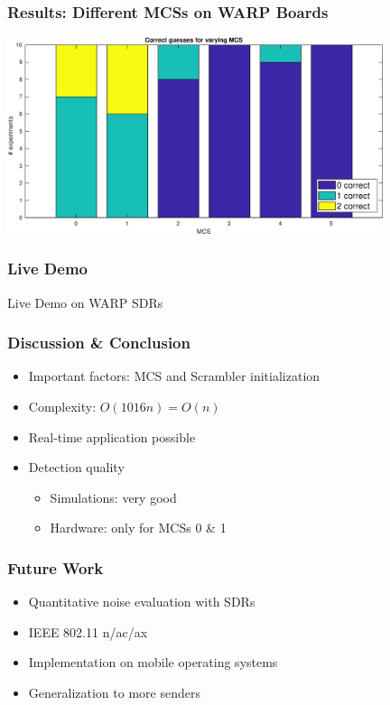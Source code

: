 \documentclass[accentcolor=tud8b,colorbacktitle]{tudbeamer}
\begin{document}
\begin{frame}
\frametitle{Results: Different MCSs on WARP Boards}
\begin{centering}
	\includegraphics[width=11cm]{../../gfx/plots/warp-mcs}\\
\end{centering}
\end{frame}


\begin{frame}
\frametitle{Live Demo}
\begin{center}
	\vspace{1.45cm}
	\Huge Live Demo on WARP SDRs
\end{center}
\end{frame}


\begin{frame}
\frametitle{Discussion \& Conclusion}
\begin{itemize}
	\setlength\itemsep{1em}
	\item Important factors: MCS and Scrambler initialization
	\item Complexity: $ O(1016n) = O(n) $
	\item Real-time application possible
	\item Detection quality
	\begin{itemize}
		\setlength\itemsep{1em}
		\vspace{1em}
		\item Simulations: very good
		\item Hardware: only for MCSs 0 \& 1
	\end{itemize}
\end{itemize}
\end{frame}

	
\begin{frame}
\frametitle{Future Work}
\begin{itemize}
	\setlength\itemsep{1em}
	\item Quantitative noise evaluation with SDRs
	\item IEEE 802.11 n/ac/ax
	\item Implementation on mobile operating systems
	\item Generalization to more senders
\end{itemize}
\end{frame}
\end{document}
